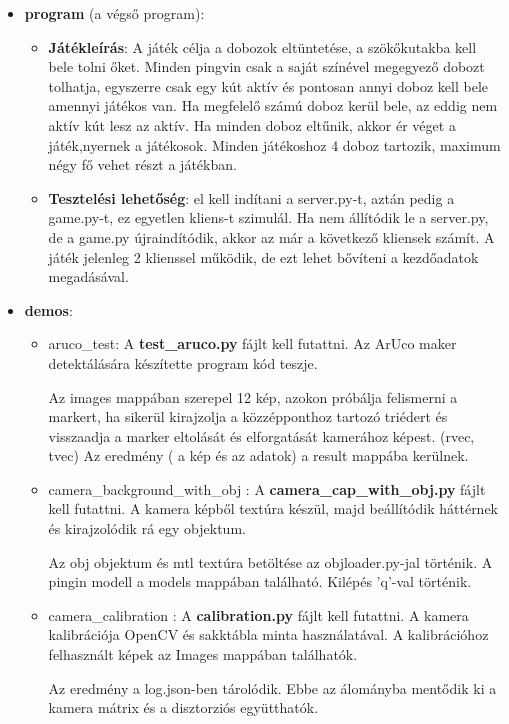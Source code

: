 \begin{itemize}
\item \textbf{program} (a végső program): 
\begin{itemize}
\item \textbf{Játékleírás}: A játék célja a dobozok eltüntetése, a szökőkutakba kell bele tolni őket.
Minden pingvin csak a saját színével megegyező dobozt tolhatja, egyszerre csak egy kút aktív és
pontosan annyi doboz kell bele amennyi játékos van. Ha megfelelő számú doboz kerül bele, az eddig nem aktív kút lesz az aktív.
Ha minden doboz eltűnik, akkor ér véget a játék,nyernek a játékosok.  
Minden játékoshoz 4 doboz tartozik, maximum négy fő vehet részt a játékban.
\item \textbf{Tesztelési lehetőség}: el kell indítani a server.py-t, aztán pedig a game.py-t, ez egyetlen kliens-t szimulál.
Ha nem állítódik le a server.py, de a game.py újraindítódik, akkor az már a következő kliensek számít.
A játék jelenleg 2 klienssel működik, de ezt lehet bővíteni a kezdőadatok megadásával.
\end{itemize}
\item \textbf{demos}:
\begin{itemize}
\item aruco\_test:
A \textbf{test\_aruco.py} fájlt kell futattni.
Az ArUco maker detektálására készítette program kód teszje. 

Az images mappában szerepel 12 kép, azokon próbálja felismerni a markert, ha sikerül kirajzolja a közzépponthoz
tartozó triédert és visszaadja a marker eltolását és elforgatását kamerához képest. (rvec, tvec)
Az eredmény ( a kép és az adatok) a result mappába kerülnek.
\item camera\_background\_with\_obj :
A \textbf{camera\_cap\_with\_obj.py} fájlt kell futattni.
A kamera képből textúra készül, majd beállítódik háttérnek és kirajzolódik rá egy objektum.

Az obj objektum és mtl textúra betöltése az objloader.py-jal történik.
A pingin modell a models mappában található.
Kilépés 'q'-val történik.
\item camera\_calibration :
A \textbf{calibration.py} fájlt kell futattni.
A kamera kalibrációja OpenCV és sakktábla minta használatával.
A kalibrációhoz felhasznált képek az Images mappában találhatók.

Az eredmény a log.json-ben tárolódik.
Ebbe az álományba mentődik ki a kamera mátrix és a disztorziós együtthatók.


\end{itemize}
\end{itemize}
